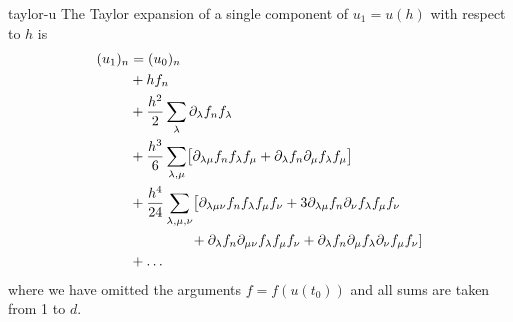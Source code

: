 \begin{Lemma}{taylor-u}
  The Taylor expansion of a single component of $u_1 = u(h)$ with
  respect to $h$ is
  \begin{gather}
    \label{eq:taylor-u:1}
    \begin{split}
      (u_1)_n &= (u_0)_n
      \\& + h f_n
      \\& + \frac{h^2}2 \sum_\lambda \partial_{\lambda} f_n f_\lambda
      \\& + \frac{h^3}6 \sum_{\lambda,\mu} \bigl[\partial_{\lambda\mu} f_n f_\lambda f_\mu
      + \partial_{\lambda}f_n \partial_{\mu}f_\lambda f_\mu\bigr]
      \\& + \frac{h^4}{24} \sum_{\lambda,\mu,\nu}
      \bigl[\partial_{\lambda\mu\nu} f_n f_\lambda f_\mu f_\nu
      + 3\partial_{\lambda\mu} f_n \partial_{\nu}f_\lambda f_\mu f_\nu
      \\&\left.\hphantom{+\frac{h^4}{24} \sum_{\lambda,\mu,\nu}}
      + \partial_{\lambda}f_n \partial_{\mu\nu} f_\lambda f_\mu f_\nu
      + \partial_{\lambda}f_n \partial_{\mu} f_\lambda \partial_{\nu} f_\mu f_\nu
      \right]
      \\&+\dots
    \end{split}
  \end{gather}
  where we have omitted the arguments $f = f(u(t_0))$ and all sums are
  taken from 1 to $d$.
\end{Lemma}

